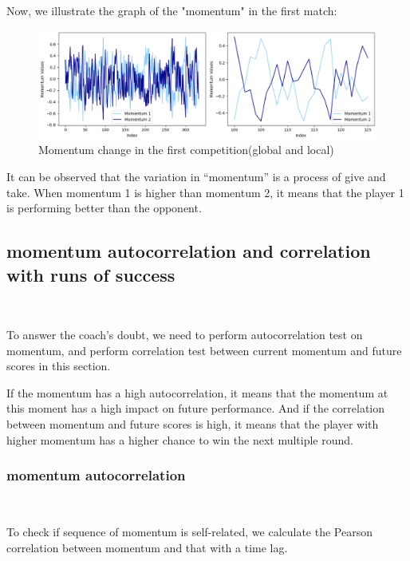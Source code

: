 Now, we illustrate the graph of the "momentum" in the first match:

\begin{figure}[H]
    \centering
    \includegraphics[scale=0.65]{mainmatter/imgs/5.png}
    \caption{Momentum change in the first competition(global and local)}
\end{figure}

It can be observed that the variation in ``momentum'' is a process of give and take.
When momentum 1 is higher than momentum 2, it means that the player 1 is performing better than the opponent. 

\subsection{momentum autocorrelation and correlation with runs of success}~{}

To answer the coach's doubt,
we need to perform autocorrelation test on momentum, 
and perform correlation test between current momentum and future scores
in this section.

If the momentum has a high autocorrelation, it means that the momentum at this moment 
has a high impact on future performance. And if the correlation between momentum and 
future scores is high, it means that the player with higher momentum has a higher
chance to win the next multiple round.

\subsubsection{momentum autocorrelation}~{}

To check if sequence of momentum is self-related, we calculate the Pearson correlation 
between momentum and that with a time lag.

